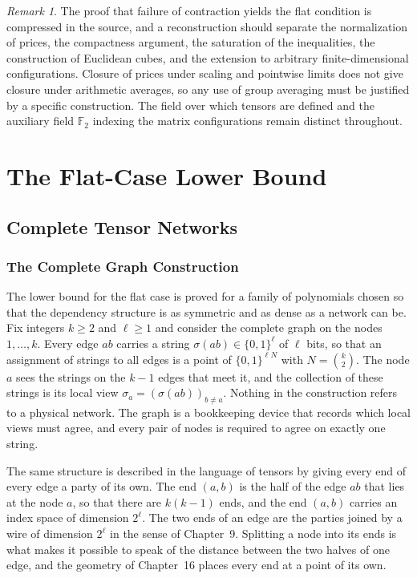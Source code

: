 \documentclass[11pt,letterpaper]{report}
\theoremstyle{plain}
\theoremstyle{definition}
\theoremstyle{remark}
\newtheorem{remark}[theorem]{Remark}
\begin{document}
\begin{remark}
The proof that failure of contraction yields the flat condition is compressed in the source, and a reconstruction should separate the normalization of prices, the compactness argument, the saturation of the inequalities, the construction of Euclidean cubes, and the extension to arbitrary finite-dimensional configurations. Closure of prices under scaling and pointwise limits does not give closure under arithmetic averages, so any use of group averaging must be justified by a specific construction. The field over which tensors are defined and the auxiliary field $\mathbb F_2$ indexing the matrix configurations remain distinct throughout.
\end{remark}

\part{The Flat-Case Lower Bound}

\chapter{Complete Tensor Networks}

\section{The Complete Graph Construction}

The lower bound for the flat case is proved for a family of polynomials chosen so that the dependency structure is as symmetric and as dense as a network can be. Fix integers $k\ge2$ and $\ell\ge1$ and consider the complete graph on the nodes $1,\ldots,k$. Every edge $ab$ carries a string $\sigma(ab)\in\{0,1\}^{\ell}$ of $\ell$ bits, so that an assignment of strings to all edges is a point of $\{0,1\}^{\ell N}$ with $N=\binom k2$. The node $a$ sees the strings on the $k-1$ edges that meet it, and the collection of these strings is its local view $\sigma_a=(\sigma(ab))_{b\ne a}$. Nothing in the construction refers to a physical network. The graph is a bookkeeping device that records which local views must agree, and every pair of nodes is required to agree on exactly one string.

The same structure is described in the language of tensors by giving every end of every edge a party of its own. The end $(a,b)$ is the half of the edge $ab$ that lies at the node $a$, so that there are $k(k-1)$ ends, and the end $(a,b)$ carries an index space of dimension $2^{\ell}$. The two ends of an edge are the parties joined by a wire of dimension $2^{\ell}$ in the sense of Chapter~9. Splitting a node into its ends is what makes it possible to speak of the distance between the two halves of one edge, and the geometry of Chapter~16 places every end at a point of its own.
\end{document}
